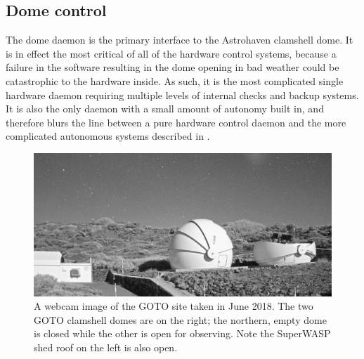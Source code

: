\subsection{Dome control}
\label{sec:dome}
\begin{colsection}

The dome daemon is the primary interface to the Astrohaven clamshell dome. It is in effect the most critical of all of the hardware control systems, because a failure in the software resulting in the dome opening in bad weather could be catastrophic to the hardware inside. As such, it is the most complicated single hardware daemon requiring multiple levels of internal checks and backup systems. It is also the only daemon with a small amount of autonomy built in, and therefore blurs the line between a pure hardware control daemon and the more complicated autonomous systems described in .

\begin{figure}[t]
    \begin{center}
        \includegraphics[width=\linewidth]{images/webcam_open.jpeg}
    \end{center}
    \caption[Webcam image of the GOTO site at night]{
        A webcam image of the GOTO site taken in June 2018. The two GOTO clamshell domes are on the right; the northern, empty dome is closed while the other is open for observing. Note the SuperWASP shed roof on the left is also open.
    }\label{fig:webcam}
\end{figure}


\end{colsection}
